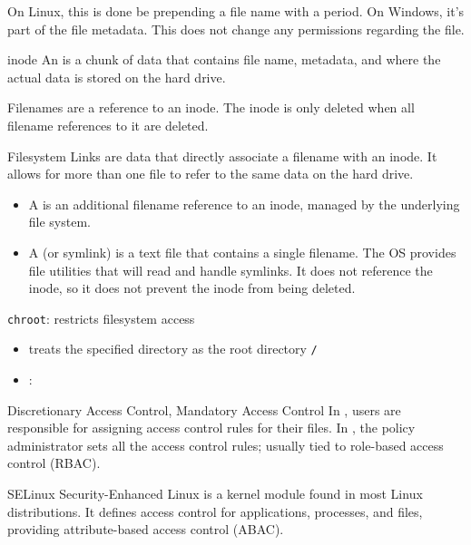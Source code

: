 \documentclass[code]{amznotes}
\begin{document}
On Linux, this is done be prepending a file name with a period. On Windows, it's part of the file metadata. This does not change any permissions regarding the file.

\begin{dfnbox}{inode}{}
    An  is a chunk of data that contains file name, metadata, and where the actual data is stored on the hard drive.
\end{dfnbox}

Filenames are a reference to an inode. The inode is only deleted when all filename references to it are deleted.

\begin{dfnbox}{Filesystem Links}{}
     are data that directly associate a filename with an inode. It allows for more than one file to refer to the same data on the hard drive.
    \begin{itemize}[noitemsep]
        \item A  is an additional filename reference to an inode, managed by the underlying file system.
        \item A  (or symlink) is a text file that contains a single filename. The OS provides file utilities that will read and handle symlinks. It does not reference the inode, so it does not prevent the inode from being deleted.
    \end{itemize}
\end{dfnbox}

\texttt{chroot}: restricts filesystem access
\begin{itemize}
    \item  treats the specified directory as the root directory \texttt{/}
    \item {}: 
\end{itemize}

\begin{dfnbox}{Discretionary Access Control, Mandatory Access Control}{}
    In , users are responsible for assigning access control rules for their files. In , the policy administrator sets all the access control rules; usually tied to role-based access control (RBAC).
\end{dfnbox}

\begin{dfnbox}{SELinux}{}
    Security-Enhanced Linux is a kernel module found in most Linux distributions. It defines access control for applications, processes, and files, providing attribute-based access control (ABAC).
\end{dfnbox}
\end{document}
